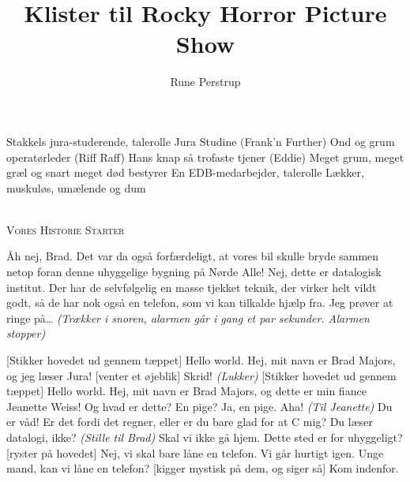 \documentclass[10pt]{article}
\title{Klister til Rocky Horror Picture Show}
\author{Rune Perstrup}
\begin{document}
\maketitle

\begin{sketch}

\begin{roles}
   Stakkels jura-studerende, talerolle
   Jura Studine
   (Frank'n Further) Ond og grum operatørleder
   (Riff Raff) Hans knap så trofaste tjener
   (Eddie) Meget grum, meget græl og snart meget død
  bestyrer
   En EDB-medarbejder, talerolle
   Lækker, muskuløs, umælende og dum
\end{roles}

\\
 \textsc{Vores Historie Starter}
\\

  Åh nej, Brad. Det var da også forfærdeligt, at vores bil skulle
bryde sammen netop foran denne uhyggelige bygning på Nørde Alle!
   Nej, dette er datalogisk institut. Der har de selvfølgelig en masse
tjekket teknik, der virker helt vildt godt, så de har nok også en telefon,
som vi kan tilkalde hjælp fra. Jeg prøver at ringe på\ldots{} \emph{(Trækker i snoren, alarmen går i gang et par sekunder. Alarmen stopper)}

 [Stikker hovedet ud gennem tæppet] Hello world.
   Hej, mit navn er Brad Majors, og jeg læser Jura!
   [venter et øjeblik] Skrid! \emph{(Lukker)}
   [Stikker hovedet ud gennem tæppet] Hello world.
   Hej, mit navn er Brad Majors, og dette er
min fiance Jeanette Weiss!
   Og hvad er dette? En pige? 
   Ja, en pige. 
   Aha! \emph{(Til Jeanette)} Du er våd! Er det fordi det regner, eller er du bare glad for at C mig?
  Du læser datalogi, ikke? \emph{(Stille til Brad)} Skal vi ikke gå hjem.
Dette sted er for uhyggeligt?
   [ryster på hovedet] Nej, vi skal bare låne en telefon. Vi går
hurtigt igen. Unge mand, kan vi låne en telefon?
   [kigger mystisk på dem, og siger så] Kom indenfor.


\end{sketch}
\end{document}
